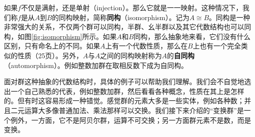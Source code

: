 \documentclass[b5paper]{ctexart}
\begin{document}
如果$f$不仅是满射，还是单射（injection）。那么它就是一一映射。这种情况下，我们称$f$是从$A$到$B$的同构映射，简称\textbf{同构}（isomorphism）。记为$A \cong B$。同构是一种非常强大的关系，不仅两个群可以同构，半群、幺半群以及其它代数结构也可以同构，如图\ref{fig:isomorphism}所示。如果$A$和$B$同构，那么抽象地来看，它们没有什么区别，只有命名上的不同。如果$A$上有一个代数性质，那么在$B$上也有一个完全类似的性质\cite{ZhangHeRui1978}（25页）。另外，$A$与$A$之间的同构映射称为$A$的\textbf{自同构}（automorphism）。例如整数加群在取相反数下成为自同构。




面对群这种抽象的代数结构时，具体的例子可以帮助我们理解。我们会不自觉地选出一个自己熟悉的代表，例如整数加群，然后看看各种概念，性质在其上是怎样的。但有时这容易形成一种错觉。感觉群的元素大多是一些实体，例如各种数；并且二元运算大多像普通加法、乘法那样可以交换。我们接下来介绍的“变换群”是一个例外，一方面，它不是阿贝尔群，运算不可交换；另一方面群元素不是数，而是变换。
\end{document}
